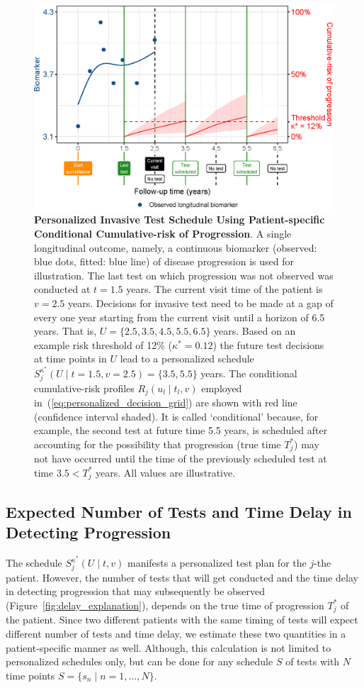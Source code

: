 \begin{figure}
\centerline{\includegraphics{images/schedule_explanation_102.eps}}
\caption{\textbf{Personalized Invasive Test Schedule Using Patient-specific Conditional Cumulative-risk of Progression}.  A single longitudinal outcome, namely, a continuous biomarker (observed: blue dots, fitted: blue line) of disease progression is used for illustration. The last test on which progression was not observed was conducted at $t=1.5$ years. The current visit time of the patient is $v=2.5$ years. Decisions for invasive test need to be made at a gap of every one year starting from the current visit until a horizon of 6.5 years. That is, $U=\{2.5, 3.5, 4.5, 5.5, 6.5\}$ years. Based on an example risk threshold of 12\% ($\kappa^*=0.12$) the future test decisions at time points in $U$ lead to a personalized schedule $S_j^{\kappa^*} (U \mid t=1.5, v=2.5) = \{3.5, 5.5\}$ years. The conditional cumulative-risk profiles $R_j(u_l \mid t_l, v)$ employed in~(\ref{eq:personalized_decision_grid}) are shown with red line (confidence interval shaded). It is called `conditional' because, for example, the second test at future time 5.5 years, is scheduled after accounting for the possibility that progression (true time $T^*_j$) may not have occurred until the time of the previously scheduled test at time $3.5 < T^*_j$ years. All values are illustrative.} 
\label{fig:schedule_explanation}
\end{figure}

\subsection{Expected Number of Tests and Time Delay in Detecting Progression}
\label{subsec:exp_delay_estimation}
The schedule $S_j^{\kappa^*}(U \mid t, v)$ manifests a personalized test plan for the $j$-the patient. However, the number of tests that will get conducted and the time delay in detecting progression that may subsequently be observed (Figure~\ref{fig:delay_explanation}), depends on the true time of progression $T^*_j$ of the patient. Since two different patients with the same timing of tests will expect different number of tests and time delay, we estimate these two quantities in a patient-specific manner as well. Although, this calculation is not limited to personalized schedules only, but can be done for any schedule $S$ of tests with $N$ time points $S=\{s_n \mid n=1,\ldots, N\}$. 

